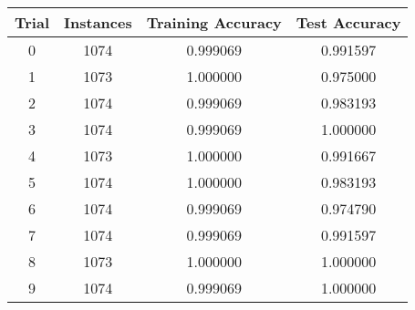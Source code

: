 {\footnotesize
\begin{tabular}{ c | c | c | c }
Trial & Instances & Training Accuracy & Test Accuracy \\
\hline
0 & 1074 & 0.999069 & 0.991597 \\
1 & 1073 & 1.000000 & 0.975000 \\
2 & 1074 & 0.999069 & 0.983193 \\
3 & 1074 & 0.999069 & 1.000000 \\
4 & 1073 & 1.000000 & 0.991667 \\
5 & 1074 & 1.000000 & 0.983193 \\
6 & 1074 & 0.999069 & 0.974790 \\
7 & 1074 & 0.999069 & 0.991597 \\
8 & 1073 & 1.000000 & 1.000000 \\
9 & 1074 & 0.999069 & 1.000000 \\
\end{tabular}
}
